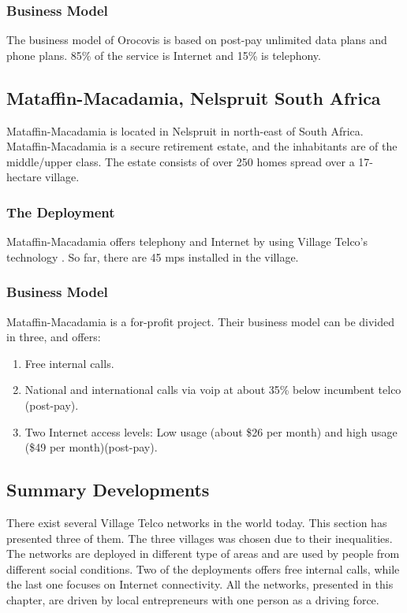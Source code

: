 \subsubsection{Business Model}
The business model of Orocovis is based on post-pay unlimited data plans and phone plans. 85\% of the service is Internet and 15\% is telephony. 

\subsection{Mataffin-Macadamia, Nelspruit South Africa}
Mataffin-Macadamia is located in Nelspruit in north-east of South Africa. Mataffin-Macadamia is a secure retirement estate, and the inhabitants are of the middle/upper class. The estate consists of over 250 homes spread over a 17-hectare village. 

\subsubsection{The Deployment}
Mataffin-Macadamia offers telephony and Internet by using Village Telco's technology \cite{mataffinict}. So far, there are 45 \glspl{mp} installed in the village.

\subsubsection{Business Model}
Mataffin-Macadamia is a for-profit project. Their business model can be divided in three, and offers: 
\begin{enumerate}
\item Free internal calls.
\item National and international calls via \gls{voip} at about 35\% below incumbent telco (post-pay).
\item Two Internet access levels: Low usage (about \$26 per month) and high usage (\$49 per month)(post-pay).
\end{enumerate}

\subsection{Summary Developments}
There exist several Village Telco networks in the world today. This section has presented three of them. The three villages was chosen due to their inequalities. The networks are deployed in different type of areas and are used by people from different social conditions. Two of the deployments offers free internal calls, while the last one focuses on Internet connectivity. All the networks, presented in this chapter, are driven by local entrepreneurs with one person as a driving force.

